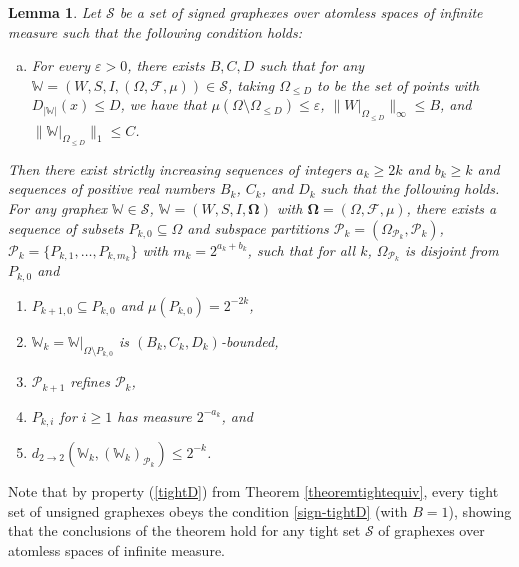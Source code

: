 \documentclass{amsart}
\numberwithin{equation}{section}
\numberwithin{figure}{section}
\newtheorem{lemma}[theorem]{Lemma}
\theoremstyle{definition}
\theoremstyle{remark}
\newcommand{\bOmega}{{\mathbf{\Omega}}}
\newcommand{\cP}{\mathcal{P}}
\newcommand{\cW}{\mathbb{W}}
\newcommand{\cS}{\mathcal{S}}
\newcommand{\cF}{\mathcal{F}}
\newcommand{\sP}{\mathscr{P}}
\def\d22{d_{2\to 2}}
\begin{document}
\begin{lemma} \label{lemmapartitionsequence}
Let $\cS$ be a set of signed graphexes over atomless spaces of infinite
measure such that the following condition holds:
\begin{enumerate}[(a)]
\item For every $\varepsilon>0$, there exists $B,C,D$ such that for any
    $\cW=(W,S,I,(\Omega,\cF,\mu))\in \cS$, taking $\Omega_{\le D}$ to be
 the set of points with $D_{|\cW|}(x)\le D$, we have that $
 \mu(\Omega\setminus\Omega_{\leq D}) \le \varepsilon$, $\|W|_{\Omega_{\leq
 D}}\|_\infty \le B$, and $\|\cW|_{\Omega_{\leq D}}\|_1 \le C$.
\label{sign-tightD}
\end{enumerate}
Then there exist strictly increasing sequences of integers $a_k \ge 2k$ and
$b_k\geq k$ and sequences of positive real numbers $B_k$, $C_k$, and $D_k$
such that the following holds. For any graphex $\cW \in \cS$,
$\cW=(W,S,I,\bOmega)$ with $\bOmega=(\Omega,\cF,\mu)$, there exists a
sequence of subsets $P_{k,0}\subseteq\Omega$ and subspace partitions
$\sP_k=(\Omega_{\sP_k},\cP_k)$, $\cP_k=\{P_{k,1},\dots,P_{k,m_k}\}$ with
$m_k=2^{a_k+b_k}$, such that for all $k$, $\Omega_{\sP_k}$ is disjoint from
$P_{k,0}$ and
\begin{enumerate}
\item $P_{k+1,0} \subseteq P_{k,0}$ and $\mu(P_{k,0})=2^{-2k}$,
    \label{partitionsequenceremoved}
\item$\cW_k=\cW|_{\Omega\setminus P_{k,0}}$ is $(B_k,C_k,D_k)$-bounded,
    \label{partitionsequencebounded}
\item $\sP_{k+1}$ refines $\sP_k$, \label{partitionsequencerefinement}
\item $P_{k,i}$ for $i \ge 1$ has measure $2^{-a_k}$, and
    \label{partitionsequencesize}
\item $\d22(\cW_k,(\cW_k)_{\sP_k})\leq 2^{-k}$.
    \label{partitionsequenceregular}
\end{enumerate}
\end{lemma}
Note that by property (\ref{tightD}) from Theorem \ref{theoremtightequiv},
every tight set of unsigned graphexes obeys the condition \eqref{sign-tightD}
(with $B=1$), showing that the conclusions of the theorem hold for any tight
set $\cS$ of graphexes over atomless spaces of infinite measure.
\end{document}
